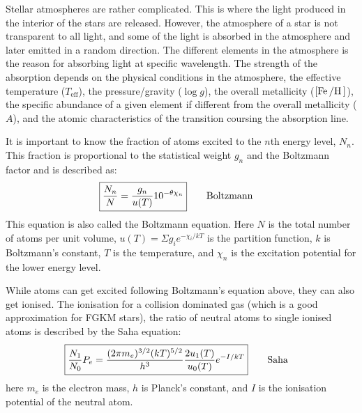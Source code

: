 Stellar atmospheres are rather complicated. This is where the light produced in
the interior of the stars are released. However, the atmosphere of a star is not
transparent to all light, and some of the light is absorbed in the atmosphere
and later emitted in a random direction. The different elements in the
atmosphere is the reason for absorbing light at specific wavelength. The
strength of the absorption depends on the physical conditions in the atmosphere,
the effective temperature ($T_\mathrm{eff}$), the pressure/gravity ($\log g$),
the overall metallicity ($[\ion{Fe}/\ion{H}]$), the specific abundance of a
given element if different from the overall metallicity ($A$), and the atomic
characteristics of the transition coursing the absorption line.

It is important to know the fraction of atoms excited to the $n$th energy level,
$N_n$. This fraction is proportional to the statistical weight $g_n$ and the
Boltzmann factor and is described as:
\begin{align}
    \Aboxed{ \frac{N_n}{N} = \frac{g_n}{u(T)} 10^{-\theta\chi_n}} \tag*{Boltzmann}
\end{align}
This equation is also called the Boltzmann equation. Here $N$ is the total
number of atoms per unit volume, $u(T)=\Sigma g_i e^{-\chi_i/kT}$ is the
partition function, $k$ is Boltzmann's constant, $T$ is the temperature, and
$\chi_n$ is the excitation potential for the lower energy level.

While atoms can get excited following Boltzmann's equation above, they can also
get ionised. The ionisation for a collision dominated gas (which is a good
approximation for FGKM stars), the ratio of neutral atoms to single ionised
atoms is described by the Saha equation:
\begin{align}
  \Aboxed{ \frac{N_1}{N_0}P_e = \frac{(2\pi m_e)^{3/2}(kT)^{5/2}}{h^3} \frac{2u_1(T)}{u_0(T)} e^{-I/kT}} \tag*{Saha}
\end{align}
here $m_e$ is the electron mass, $h$ is Planck's constant, and $I$ is the
ionisation potential of the neutral atom.

